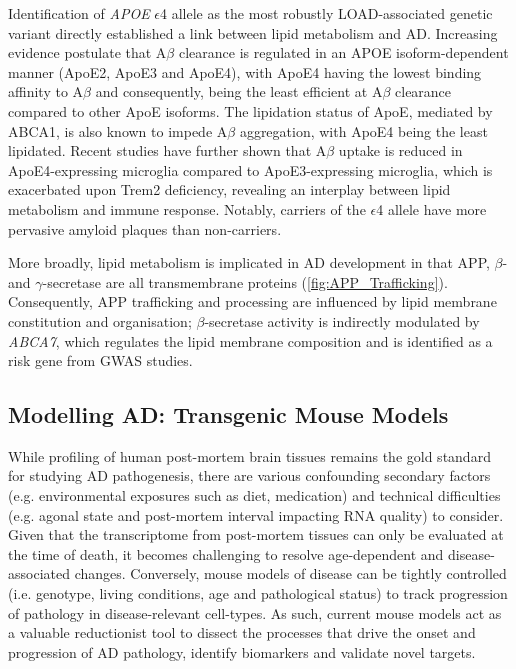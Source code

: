 \label{intro_lipid}
Identification of \textit{APOE} $\epsilon$4 allele as the most robustly LOAD-associated genetic variant directly established a link between lipid metabolism and AD. Increasing evidence postulate that A$\beta$ clearance is regulated in an APOE isoform-dependent manner (ApoE2, ApoE3 and ApoE4)\cite{Castellano2011}, with ApoE4 having the lowest binding affinity to A$\beta$ and consequently, being the least efficient at A$\beta$ clearance compared to other ApoE isoforms\cite{RM2012}. The lipidation status of ApoE, mediated by ABCA1\cite{R2010}, is also known to impede A$\beta$ aggregation, with ApoE4 being the least lipidated\cite{DM2006}. Recent studies have further shown that A$\beta$ uptake is reduced in ApoE4-expressing microglia compared to ApoE3-expressing microglia, which is exacerbated upon Trem2 deficiency, revealing an interplay between lipid metabolism and immune response\cite{Fitz2021}. Notably, carriers of the $\epsilon$4 allele have more pervasive amyloid plaques than non-carriers\cite{DE1993,E2009}.

More broadly, lipid metabolism is implicated in AD development in that APP, $\beta$- and $\gamma$-secretase are all transmembrane proteins (\cref{fig:APP_Trafficking}). Consequently, APP trafficking and processing are influenced by lipid membrane constitution and organisation\cite{DiPaolo2011}; $\beta$-secretase activity is indirectly modulated by \textit{ABCA7}, which regulates the lipid membrane composition and is identified as a risk gene from GWAS studies\cite{Sierksma2020,Sakae2016}.  


\clearpage
\subsection{Modelling AD: Transgenic Mouse Models}
While profiling of human post-mortem brain tissues remains the gold standard for studying AD pathogenesis, there are various confounding secondary factors (e.g. environmental exposures such as diet, medication) and technical difficulties (e.g. agonal state and post-mortem interval impacting RNA quality) to consider. Given that the transcriptome from post-mortem tissues can only be evaluated at the time of death, it becomes challenging to resolve age-dependent and disease-associated changes. Conversely, mouse models of disease can be tightly controlled (i.e. genotype, living conditions, age and pathological status) to track progression of pathology in disease-relevant cell-types. As such, current mouse models act as a valuable reductionist tool to dissect the processes that drive the onset and progression of AD pathology, identify biomarkers and validate novel targets\cite{Hall2012}.

